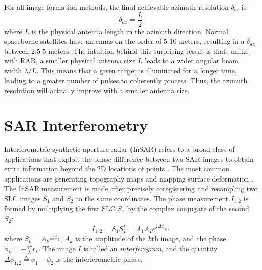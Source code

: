 For all image formation methods, the final achievable azimuth resolution $\delta_{az}$ is
\begin{equation}
	\delta_{az} = \frac{L}{2}
\end{equation}
where $L$ is the physical antenna length in the azimuth direction.
Normal spaceborne satellites have antennas on the order of 5-10 meters, resulting in a $\delta_{az} $ between 2.5-5 meters.
The intuition behind this surprising result is that, unlike with RAR, a smaller physical antenna size $L$ leads to a wider angular beam width $ \lambda / L$. This means that a given target is illuminated for a longer time, leading to a greater number of pulses to coherently process. Thus, the azimuth resolution will actually improve with a smaller antenna size.



\section{SAR Interferometry}

Interferometric synthetic aperture radar (InSAR) refers to a broad class of applications that exploit the phase difference between two SAR images to obtain extra information beyond the 2D locations of points \citep{Bamler1998SyntheticApertureRadar}. The most common applications are generating topography maps \citep{Graham1974SyntheticInterferometerRadar, Zebker1986TopographicMappingInterferometric} and mapping surface deformation \citep{Goldstein1987InterferometricRadarMeasurement, Gabriel1989MappingSmallElevation, Li1990StudiesMultibaselineSpaceborne, Massonnet1993DisplacementFieldLanders, Rosen2000SyntheticApertureRadar}. 
The InSAR measurement is made after precisely coregistering and resampling two SLC images $S_1$ and $S_2$ to the same coordinates. The phase measurement $I_{1,2}$ is formed by multiplying the first SLC $S_1$ by the complex conjugate of the second $S_2$: 
\begin{equation}
I_{1,2} = S_1 S_2^{*} = A_1 A_2 e^{j \Delta \phi_{1,2}}  \label{eq:insar-conj-mult}
\end{equation}
where $S_k = A_k e^{j \phi_k}$, $A_k$ is the amplitude of the $k$th image, and the phase $\phi_k = -\frac{4 \pi}{\lambda} r_k$. The image $I$ is called an \emph{interferogram},  and the quantity $\Delta \phi_{1,2} \triangleq  \phi_1 - \phi_2$ is the interferometric phase.


